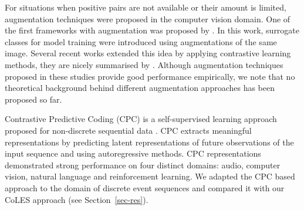 \documentclass{article}
\begin{document}
For situations when positive pairs are not available or their amount is limited, augmentation techniques were proposed in the computer vision domain. One of the first frameworks with augmentation  was proposed by \cite{Dosovitskiy2014DiscriminativeUF}. In this work, surrogate classes for model training were introduced using augmentations of the same image. Several recent works \citep{Bachman2019LearningRB, He2019MomentumCF, Chen2020ASF} extended this idea by applying contrastive learning methods, they are nicely summarised by \cite{Falcon2020AFF}. Although augmentation techniques proposed in these studies provide good performance empirically, we note that no theoretical background behind different augmentation approaches has been proposed so far.

Contrastive Predictive Coding (CPC) is a self-supervised learning approach proposed for non-discrete sequential data \citep{Oord2018RepresentationLW}. CPC extracts meaningful representations by predicting latent representations of future observations of the input sequence and using autoregressive methods. CPC representations demonstrated strong performance on four distinct domains: audio, computer vision, natural language and reinforcement learning. We adapted the CPC based approach to the domain of discrete event sequences and compared it with our CoLES approach (see Section~\ref{sec-res}).



\end{document}
